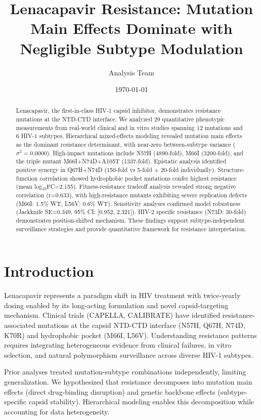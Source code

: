 \documentclass[11pt]{article}
\title{Lenacapavir Resistance: Mutation Main Effects Dominate with Negligible Subtype Modulation}
\author{Analysis Team}
\date{\today}
\begin{document}
\maketitle

\begin{abstract}
Lenacapavir, the first-in-class HIV-1 capsid inhibitor, demonstrates resistance mutations at the NTD-CTD interface. We analyzed 29 quantitative phenotypic measurements from real-world clinical and in vitro studies spanning 12 mutations and 6 HIV-1 subtypes. Hierarchical mixed-effects modeling revealed mutation main effects as the dominant resistance determinant, with near-zero between-subtype variance ($\sigma^2=0.0000$). High-impact mutations include N57H (4890-fold), M66I (3200-fold), and the triple mutant M66I+N74D+A105T (1337-fold). Epistatic analysis identified positive synergy in Q67H+N74D (150-fold vs 5-fold + 20-fold individually). Structure-function correlation showed hydrophobic pocket mutations confer highest resistance (mean log$_{10}$FC=2.155). Fitness-resistance tradeoff analysis revealed strong negative correlation (r=0.633), with high-resistance mutants exhibiting severe replication defects (M66I: 1.5\% WT, L56V: 0.6\% WT). Sensitivity analyses confirmed model robustness (Jackknife SE=0.349, 95\% CI: [0.952, 2.321]). HIV-2 specific resistance (N73D: 30-fold) demonstrates position-shifted mechanism. These findings support subtype-independent surveillance strategies and provide quantitative framework for resistance interpretation.
\end{abstract}

\section{Introduction}

Lenacapavir represents a paradigm shift in HIV treatment with twice-yearly dosing enabled by its long-acting formulation and novel capsid-targeting mechanism. Clinical trials (CAPELLA, CALIBRATE) have identified resistance-associated mutations at the capsid NTD-CTD interface (N57H, Q67H, N74D, K70R) and hydrophobic pocket (M66I, L56V). Understanding resistance patterns requires integrating heterogeneous evidence from clinical failures, in vitro selection, and natural polymorphism surveillance across diverse HIV-1 subtypes.

Prior analyses treated mutation-subtype combinations independently, limiting generalization. We hypothesized that resistance decomposes into mutation main effects (direct drug-binding disruption) and genetic backbone effects (subtype-specific capsid stability). Hierarchical modeling enables this decomposition while accounting for data heterogeneity.
\end{document}
